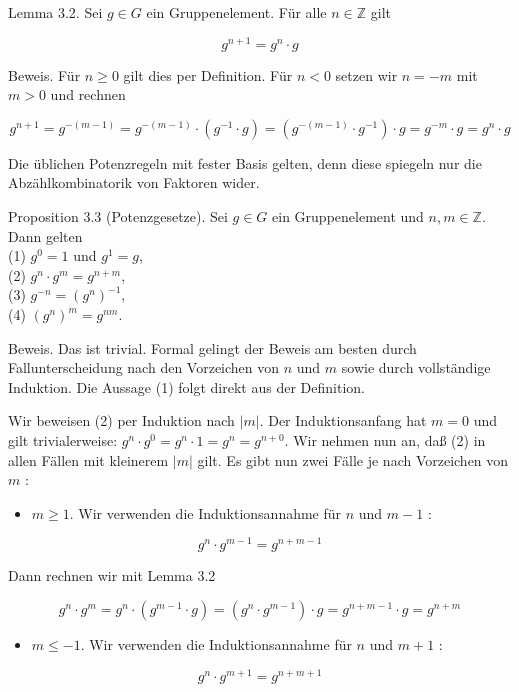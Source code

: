 \documentclass[10pt, letterpaper]{article}
\begin{document}
Lemma 3.2. Sei $g \in G$ ein Gruppenelement. Für alle $n \in \mathbb{Z}$ gilt

$$
g^{n+1}=g^{n} \cdot g
$$

Beweis. Für $n \geq 0$ gilt dies per Definition. Für $n<0$ setzen wir $n=-m$ mit $m>0$ und rechnen

$$
g^{n+1}=g^{-(m-1)}=g^{-(m-1)} \cdot\left(g^{-1} \cdot g\right)=\left(g^{-(m-1)} \cdot g^{-1}\right) \cdot g=g^{-m} \cdot g=g^{n} \cdot g
$$

Die üblichen Potenzregeln mit fester Basis gelten, denn diese spiegeln nur die Abzählkombinatorik von Faktoren wider.

Proposition 3.3 (Potenzgesetze). Sei $g \in G$ ein Gruppenelement und $n, m \in \mathbb{Z}$. Dann gelten\\
(1) $g^{0}=1$ und $g^{1}=g$,\\
(2) $g^{n} \cdot g^{m}=g^{n+m}$,\\
(3) $g^{-n}=\left(g^{n}\right)^{-1}$,\\
(4) $\left(g^{n}\right)^{m}=g^{n m}$.

Beweis. Das ist trivial. Formal gelingt der Beweis am besten durch Fallunterscheidung nach den Vorzeichen von $n$ und $m$ sowie durch vollständige Induktion. Die Aussage (1) folgt direkt aus der Definition.

Wir beweisen (2) per Induktion nach $|m|$. Der Induktionsanfang hat $m=0$ und gilt trivialerweise: $g^{n} \cdot g^{0}=g^{n} \cdot 1=g^{n}=g^{n+0}$. Wir nehmen nun an, daß (2) in allen Fällen mit kleinerem $|m|$ gilt. Es gibt nun zwei Fälle je nach Vorzeichen von $m$ :

\begin{itemize}
  \item $m \geq 1$. Wir verwenden die Induktionsannahme für $n$ und $m-1$ :
\end{itemize}

$$
g^{n} \cdot g^{m-1}=g^{n+m-1}
$$

Dann rechnen wir mit Lemma 3.2

$$
g^{n} \cdot g^{m}=g^{n} \cdot\left(g^{m-1} \cdot g\right)=\left(g^{n} \cdot g^{m-1}\right) \cdot g=g^{n+m-1} \cdot g=g^{n+m}
$$

\begin{itemize}
  \item $m \leq-1$. Wir verwenden die Induktionsannahme für $n$ und $m+1$ :
\end{itemize}

$$
g^{n} \cdot g^{m+1}=g^{n+m+1}
$$
\end{document}

